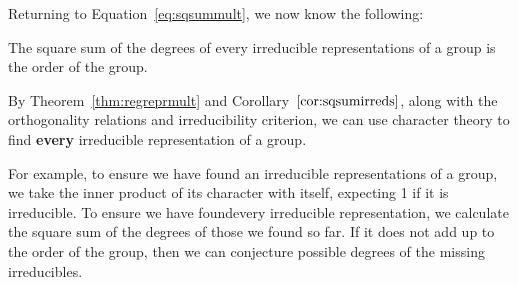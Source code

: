 Returning to Equation~\ref{eq:sqsummult},  we now know the following:
\begin{corollary}\label{cor:sqsumirreds}
	The square sum of the degrees of every irreducible representations of a group is the order of the group.
\end{corollary}

\begin{remark}
	By Theorem~\ref{thm:regreprmult} and Corollary~$\ref{cor:sqsumirreds}$, along with the orthogonality relations and irreducibility criterion, we can use character theory to find \textbf{every} irreducible representation of a group. 
\end{remark}

For example, to ensure we have found an irreducible representations of a group, we take the inner product of its character with itself, expecting 1 if it is irreducible. To ensure we have foundevery irreducible representation, we calculate the square sum of the degrees of those we found so far. If it does not add up to the order of the group, then we can conjecture possible degrees of the missing irreducibles.




